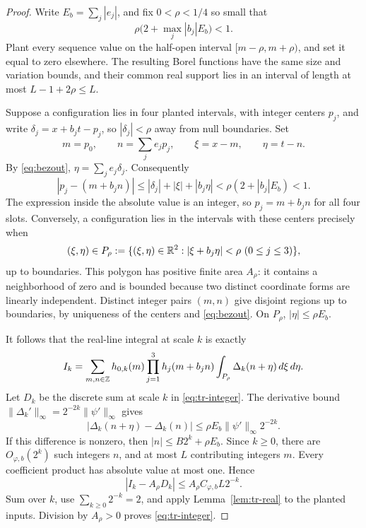 \begin{proof}
Write \(E_b=\sum_j|e_j|\), and fix \(0<\rho<1/4\) so small that
\begin{equation}
 \rho\bigl(2+\max_j|b_j|E_b\bigr)<1.
 \label{eq:tr-radius}
\end{equation}
Plant every sequence value on the half-open interval
\([m-\rho,m+\rho)\), and set it equal to zero elsewhere.  The
resulting Borel functions have the same size and variation bounds,
and their common real support lies in an interval of length at most
\(L-1+2\rho\leq L\).

Suppose a configuration lies in four planted intervals, with integer
centers \(p_j\), and write
\(\delta_j=x+b_jt-p_j\), so \(|\delta_j|<\rho\) away from null
boundaries.  Set
\[
 m=p_0,\qquad n=\sum_je_jp_j,\qquad
 \xi=x-m,\qquad\eta=t-n.
\]
By \eqref{eq:bezout}, \(\eta=\sum_je_j\delta_j\).  Consequently
\[
 |p_j-(m+b_jn)|
 \leq |\delta_j|+|\xi|+|b_j\eta|
 <\rho(2+|b_j|E_b)<1.
\]
The expression inside the absolute value is an integer, so
\(p_j=m+b_jn\) for all four slots.  Conversely, a configuration
lies in the intervals with these centers precisely when
\[
 (\xi,\eta)\in P_\rho
 :=\{(\xi,\eta)\in\mathbb R^2:|\xi+b_j\eta|<\rho\ (0\leq j\leq3)\},
\]
up to boundaries.  This polygon has positive finite area
\(A_\rho\): it contains a neighborhood of zero and is bounded because
two distinct coordinate forms are linearly independent.  Distinct
integer pairs \((m,n)\) give disjoint regions up to boundaries,
by uniqueness of the centers and \eqref{eq:bezout}.  On
\(P_\rho\), \(|\eta|\leq\rho E_b\).

It follows that the real-line integral at scale \(k\) is exactly
\[
 I_k=\sum_{m,n\in\mathbb Z}h_{0,k}(m)\prod_{j=1}^3h_j(m+b_jn)
       \int_{P_\rho}\Delta_k(n+\eta)\,d\xi\,d\eta.
\]
Let \(D_k\) be the discrete sum at scale \(k\) in
\eqref{eq:tr-integer}.  The derivative bound
\(\|\Delta_k'\|_\infty=2^{-2k}\|\psi'\|_\infty\) gives
\[
 |\Delta_k(n+\eta)-\Delta_k(n)|
 \leq \rho E_b\|\psi'\|_\infty2^{-2k}.
\]
If this difference is nonzero, then
\(|n|\leq B2^k+\rho E_b\).  Since \(k\geq0\), there are
\(O_{\varphi,b}(2^k)\) such integers \(n\), and at most \(L\)
contributing integers \(m\).  Every coefficient product has absolute
value at most one.  Hence
\[
 |I_k-A_\rho D_k|\leq A_\rho C_{\varphi,b}L2^{-k}.
\]
Sum over \(k\), use \(\sum_{k\geq0}2^{-k}=2\), and apply
Lemma~\ref{lem:tr-real} to the planted inputs.  Division by
\(A_\rho>0\) proves \eqref{eq:tr-integer}.
\end{proof}

